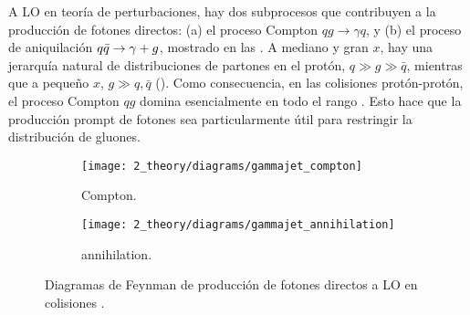 A \ac{LO} en teoría de perturbaciones, hay dos subprocesos que contribuyen a la producción de fotones directos: (a) el proceso Compton \(qg \to \gamma q\), y (b) el proceso de aniquilación \(q\bar{q} \rightarrow \gamma+g\), mostrado en las \Figs{\ref{fig:theory:sm:prompt_photon:feynman_lo_direct:compton}}{\ref{fig:theory:sm:prompt_photon:feynman_lo_direct:annihilation}}. A mediano y gran \(x\), hay una jerarquía natural de distribuciones de partones en el protón, \(q \gg g \gg \bar{q}\), mientras que a pequeño \(x\), \(g \gg q,\bar{q}\) (\Fig{\ref{fig:theory:sm:hadron_interactions:pdfs}}). Como consecuencia, en las colisiones protón-protón, el proceso Compton \(qg\) domina esencialmente en todo el rango \pt. Esto hace que la producción prompt de fotones sea particularmente útil para restringir la distribución de gluones.

\begin{figure}[ht!]
    \centering
    \begin{subfigure}[h]{0.49\linewidth}
        \centering
        \texttt{[image: 2\_theory/diagrams/gammajet\_compton]}
        \caption{Compton.}
        \label{fig:theory:sm:prompt_photon:feynman_lo_direct:compton}
    \end{subfigure}
    \hfill
    \begin{subfigure}[h]{0.49\linewidth}
        \centering
        \texttt{[image: 2\_theory/diagrams/gammajet\_annihilation]}
        \caption{annihilation.}
        \label{fig:theory:sm:prompt_photon:feynman_lo_direct:annihilation}
    \end{subfigure}
    \caption{Diagramas de Feynman de producci\'on de fotones directos a \ac{LO} en colisiones \pp.}
    \label{fig:theory:sm:prompt_photon:feynman_lo_direct}
\end{figure}

